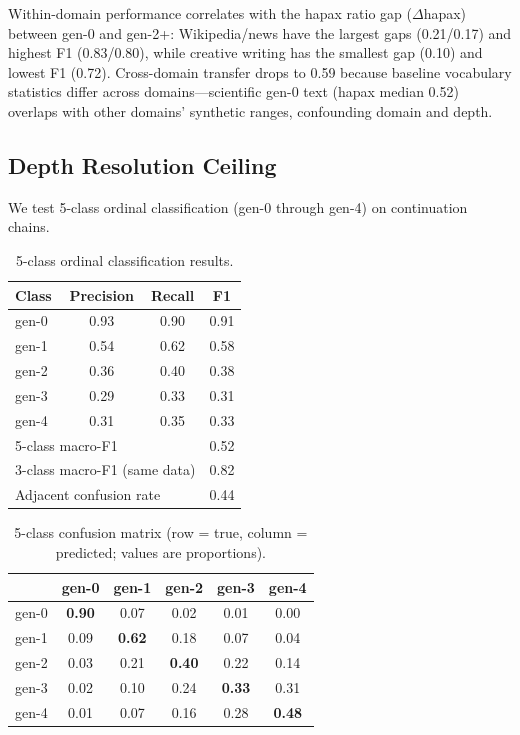 \documentclass[letterpaper]{article}
\begin{document}
Within-domain performance correlates with the hapax ratio gap ($\Delta$hapax) between gen-0 and gen-2+: Wikipedia/news have the largest gaps (0.21/0.17) and highest F1 (0.83/0.80), while creative writing has the smallest gap (0.10) and lowest F1 (0.72). Cross-domain transfer drops to 0.59 because baseline vocabulary statistics differ across domains---scientific gen-0 text (hapax median 0.52) overlaps with other domains' synthetic ranges, confounding domain and depth.

\subsection{Depth Resolution Ceiling}
\label{sec:ordinal}

We test 5-class ordinal classification (gen-0 through gen-4) on continuation chains.

\begin{table}[h]
\centering
\caption{5-class ordinal classification results.}
\label{tab:ordinal}
\begin{tabular}{lccc}
\toprule
Class & Precision & Recall & F1 \\
\midrule
gen-0 & 0.93 & 0.90 & 0.91 \\
gen-1 & 0.54 & 0.62 & 0.58 \\
gen-2 & 0.36 & 0.40 & 0.38 \\
gen-3 & 0.29 & 0.33 & 0.31 \\
gen-4 & 0.31 & 0.35 & 0.33 \\
\midrule
\multicolumn{3}{l}{5-class macro-F1} & 0.52 \\
\multicolumn{3}{l}{3-class macro-F1 (same data)} & 0.82 \\
\multicolumn{3}{l}{Adjacent confusion rate} & 0.44 \\
\bottomrule
\end{tabular}
\end{table}

\begin{table}[h]
\centering
\caption{5-class confusion matrix (row = true, column = predicted; values are proportions).}
\label{tab:confusion}
\begin{tabular}{lccccc}
\toprule
 & gen-0 & gen-1 & gen-2 & gen-3 & gen-4 \\
\midrule
gen-0 & \textbf{0.90} & 0.07 & 0.02 & 0.01 & 0.00 \\
gen-1 & 0.09 & \textbf{0.62} & 0.18 & 0.07 & 0.04 \\
gen-2 & 0.03 & 0.21 & \textbf{0.40} & 0.22 & 0.14 \\
gen-3 & 0.02 & 0.10 & 0.24 & \textbf{0.33} & 0.31 \\
gen-4 & 0.01 & 0.07 & 0.16 & 0.28 & \textbf{0.48} \\
\bottomrule
\end{tabular}
\end{table}
\end{document}
